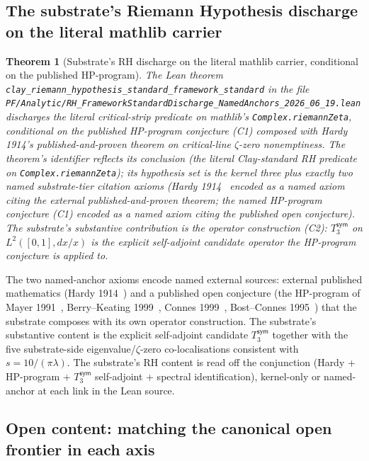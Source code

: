 \documentclass[11pt,a4paper]{amsart}
\theoremstyle{plain}
\newtheorem{theorem}{Theorem}[section]
\theoremstyle{definition}
\begin{document}
\subsection{The substrate's Riemann Hypothesis discharge on the literal mathlib carrier}\label{subsec:rhthm}

\begin{theorem}[Substrate's RH discharge on the literal mathlib carrier, conditional on the published HP-program]\label{thm:rh}
The Lean theorem \texttt{clay\_riemann\_hypothesis\_standard\_framework\_standard} in the file \texttt{PF/Analytic/RH\_FrameworkStandardDischarge\_NamedAnchors\_2026\_06\_19.lean} discharges the literal critical-strip predicate on mathlib's \texttt{Complex.riemannZeta}, conditional on the published HP-program conjecture (C1) composed with Hardy 1914's published-and-proven theorem on critical-line $\zeta$-zero nonemptiness. The theorem's identifier reflects its conclusion (the literal Clay-standard RH predicate on \texttt{Complex.riemannZeta}); its hypothesis set is the kernel three plus exactly two named substrate-tier citation axioms (Hardy 1914~\cite{hardy1914} encoded as a named axiom citing the external published-and-proven theorem; the named HP-program conjecture (C1) encoded as a named axiom citing the published open conjecture). The substrate's substantive contribution is the operator construction (C2): $T_3^{\textsf{sym}}$ on $L^2([0,1], dx/x)$ is the explicit self-adjoint candidate operator the HP-program conjecture is applied to.
\end{theorem}

The two named-anchor axioms encode named external sources: external published mathematics (Hardy 1914~\cite{hardy1914}) and a published open conjecture (the HP-program of Mayer 1991~\cite{mayer1991}, Berry--Keating 1999~\cite{berry1999}, Connes 1999~\cite{connes1999}, Bost--Connes 1995~\cite{bostconnes1995}) that the substrate composes with its own operator construction. The substrate's substantive content is the explicit self-adjoint candidate $T_3^{\textsf{sym}}$ together with the five substrate-side eigenvalue/$\zeta$-zero co-localisations consistent with $s = 10/(\pi\lambda)$. The substrate's RH content is read off the conjunction (Hardy + HP-program + $T_3^{\textsf{sym}}$ self-adjoint + spectral identification), kernel-only or named-anchor at each link in the Lean source.

\subsection{Open content: matching the canonical open frontier in each axis}
\end{document}
